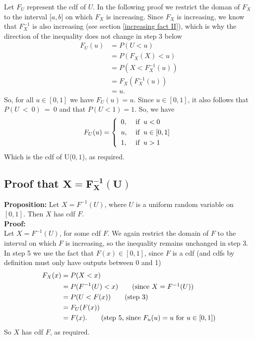 \noindent Let $F_U$ represent the cdf of $U$. In the following proof we restrict the doman of $F_X$ to the interval [$a,b$] on which $F_X$ is increasing. Since $F_X$ is increasing, we know that $F^{-1}_X$ is also increasing (see section \ref{increasing fact II}), which is why the direction of the inequality does not change in step 3 below
\begin{align*}
F_U(u) & = P(U < u) \\
	& = P(F_X(X) < u) \tag{since $U = F_X(x)$} \\
	& = P(X < F^{-1}_X(u)) \tag{step 3} \\
	& = F_X(F^{-1}_X(u)) \tag{by defintion of a cdf, i.e., $F_X(x) = P(X < x)$} \\
	& = u. \tag{since inverse functions undo eachother}
\end{align*}
So, for all $u \in [0,1]$ we have $F_U(u) = u$. Since $u \in [0,1]$, it also follows that $P(U~<~0)~=~0$ and that $P(U < 1) = 1$. So, we have
\[
F_U(u) = \left\{\begin{array}{ll}
0, & \; \text{if} \;\; u < 0  \smallskip \\
u, & \; \text{if} \;\; u \in [0,1]  \smallskip \\ 
1, & \; \text{if} \;\; u > 1
\end{array} \right.
\]
Which is the cdf of U($0,1$), as required.
\subsection{Proof that $\boldsymbol{X = F^{-1}_X(U)}$}
\textbf{Proposition:} Let $X = F^{-1}(U)$, where $U$ is a uniform random variable on $[0,1]$. Then $X$ has cdf $F$. \\

\noindent \textbf{Proof:} \\
Let $X =  F^{-1}(U)$, for some cdf $F$. We again restrict the domain of $F$ to the interval on which $F$ is increasing, so the inequality remains unchanged in step 3. In step 5 we use the fact that $F(x) \in [0,1]$, since $F$ is a cdf (and cdfs by definition must only have outputs between 0 and 1)
\begin{align*}
F_X(x) & = P(X < x) \\
	& = P(F^{-1}(U) < x) \tag{since $X = F^{-1}(U)$} \\
	& = P(U < F(x)) \tag{step 3} \\
	& = F_U(F(x)) \\
	& = F(x). \tag{step 5, since $F_u(u) = u$ for $u \in [0,1]$}
\end{align*}
So $X$ has cdf $F$, as required.


